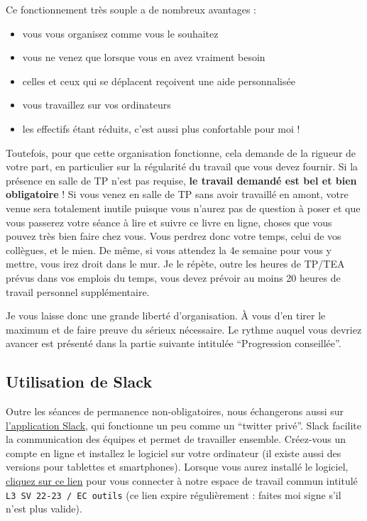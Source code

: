 \documentclass[
  a4paper,
  DIV=11,
  numbers=noendperiod,
  oneside]{scrreprt}
\providecommand{\tightlist}{%
  \setlength{\itemsep}{0pt}\setlength{\parskip}{0pt}}\usepackage{longtable,booktabs,array}
\begin{document}
Ce fonctionnement très souple a de nombreux avantages :

\begin{itemize}
\tightlist
\item
  vous vous organisez comme vous le souhaitez
\item
  vous ne venez que lorsque vous en avez vraiment besoin
\item
  celles et ceux qui se déplacent reçoivent une aide personnalisée
\item
  vous travaillez sur vos ordinateurs
\item
  les effectifs étant réduits, c'est aussi plus confortable pour moi !
\end{itemize}

Toutefois, pour que cette organisation fonctionne, cela demande de la
rigueur de votre part, en particulier sur la régularité du travail que
vous devez fournir. Si la présence en salle de TP n'est pas requise,
\textbf{le travail demandé est bel et bien obligatoire} ! Si vous venez
en salle de TP sans avoir travaillé en amont, votre venue sera
totalement inutile puisque vous n'aurez pas de question à poser et que
vous passerez votre séance à lire et suivre ce livre en ligne, choses
que vous pouvez très bien faire chez vous. Vous perdrez donc votre
temps, celui de vos collègues, et le mien. De même, si vous attendez la
4e semaine pour vous y mettre, vous irez droit dans le mur. Je le
répète, outre les heures de TP/TEA prévus dans vos emplois du temps,
vous devez prévoir au moins 20 heures de travail personnel
supplémentaire.

Je vous laisse donc une grande liberté d'organisation. À vous d'en tirer
le maximum et de faire preuve du sérieux nécessaire. Le rythme auquel
vous devriez avancer est présenté dans la partie suivante intitulée
``Progression conseillée''.

\hypertarget{utilisation-de-slack}{%
\subsection*{Utilisation de Slack}\label{utilisation-de-slack}}

Outre les séances de permanence non-obligatoires, nous échangerons aussi
sur \href{https://slack.com/intl/fr-fr/}{l'application Slack}, qui
fonctionne un peu comme un ``twitter privé''. Slack facilite la
communication des équipes et permet de travailler ensemble. Créez-vous
un compte en ligne et installez le logiciel sur votre ordinateur (il
existe aussi des versions pour tablettes et smartphones). Lorsque vous
aurez installé le logiciel,
\href{https://join.slack.com/t/l3sv22-23ecoutil/shared_invite/zt-1hmldkjae-Y9VADlxH~iM5u3PPMUF9_A}{cliquez
sur ce lien} pour vous connecter à notre espace de travail commun
intitulé \texttt{L3\ SV\ 22-23\ /\ EC\ outils} (ce lien expire
régulièrement : faites moi signe s'il n'est plus valide).
\end{document}
